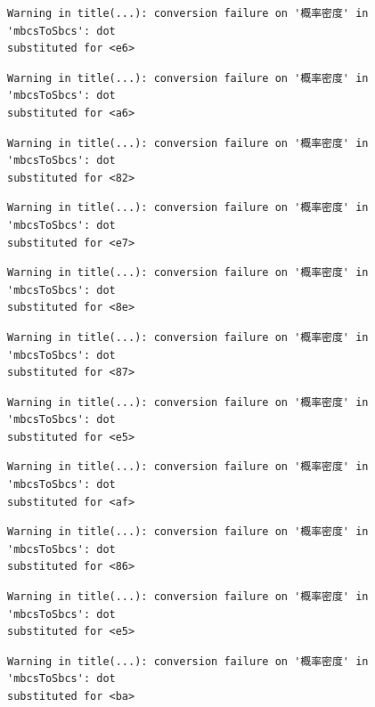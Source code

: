 \documentclass[
  letterpaper,
  DIV=11,
  numbers=noendperiod]{scrreprt}
\begin{document}
\begin{verbatim}
Warning in title(...): conversion failure on '概率密度' in 'mbcsToSbcs': dot
substituted for <e6>
\end{verbatim}

\begin{verbatim}
Warning in title(...): conversion failure on '概率密度' in 'mbcsToSbcs': dot
substituted for <a6>
\end{verbatim}

\begin{verbatim}
Warning in title(...): conversion failure on '概率密度' in 'mbcsToSbcs': dot
substituted for <82>
\end{verbatim}

\begin{verbatim}
Warning in title(...): conversion failure on '概率密度' in 'mbcsToSbcs': dot
substituted for <e7>
\end{verbatim}

\begin{verbatim}
Warning in title(...): conversion failure on '概率密度' in 'mbcsToSbcs': dot
substituted for <8e>
\end{verbatim}

\begin{verbatim}
Warning in title(...): conversion failure on '概率密度' in 'mbcsToSbcs': dot
substituted for <87>
\end{verbatim}

\begin{verbatim}
Warning in title(...): conversion failure on '概率密度' in 'mbcsToSbcs': dot
substituted for <e5>
\end{verbatim}

\begin{verbatim}
Warning in title(...): conversion failure on '概率密度' in 'mbcsToSbcs': dot
substituted for <af>
\end{verbatim}

\begin{verbatim}
Warning in title(...): conversion failure on '概率密度' in 'mbcsToSbcs': dot
substituted for <86>
\end{verbatim}

\begin{verbatim}
Warning in title(...): conversion failure on '概率密度' in 'mbcsToSbcs': dot
substituted for <e5>
\end{verbatim}

\begin{verbatim}
Warning in title(...): conversion failure on '概率密度' in 'mbcsToSbcs': dot
substituted for <ba>
\end{verbatim}
\end{document}
